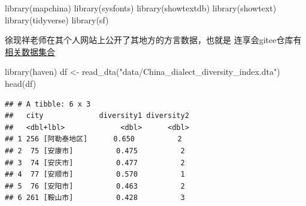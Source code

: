 \documentclass[
  oneside]{book}
\newenvironment{Shaded}{\begin{snugshade}}{\end{snugshade}}
\newcommand{\AttributeTok}[1]{\textcolor[rgb]{0.77,0.63,0.00}{#1}}
\newcommand{\FunctionTok}[1]{\textcolor[rgb]{0.00,0.00,0.00}{#1}}
\newcommand{\NormalTok}[1]{#1}
\newcommand{\OtherTok}[1]{\textcolor[rgb]{0.56,0.35,0.01}{#1}}
\newcommand{\SpecialCharTok}[1]{\textcolor[rgb]{0.00,0.00,0.00}{#1}}
\newcommand{\StringTok}[1]{\textcolor[rgb]{0.31,0.60,0.02}{#1}}
\begin{document}
\begin{Shaded}
\begin{Highlighting}[]
\FunctionTok{library}\NormalTok{(mapchina)}
\FunctionTok{library}\NormalTok{(sysfonts)}
\FunctionTok{library}\NormalTok{(showtextdb)}
\FunctionTok{library}\NormalTok{(showtext)}
\FunctionTok{library}\NormalTok{(tidyverse)}
\FunctionTok{library}\NormalTok{(sf)}
\end{Highlighting}
\end{Shaded}

徐现祥老师在其个人网站上公开了其地方的方言数据，也就是
连享会gitee仓库有\href{https://gitee.com/arlionn/IRE/tree/master/}{相关数据集合}

\begin{Shaded}
\begin{Highlighting}[]
\FunctionTok{library}\NormalTok{(haven)}
\NormalTok{df }\OtherTok{\textless{}{-}} \FunctionTok{read\_dta}\NormalTok{(}\StringTok{"data/China\_dialect\_diversity\_index.dta"}\NormalTok{)}
\FunctionTok{head}\NormalTok{(df)}
\end{Highlighting}
\end{Shaded}

\begin{verbatim}
## # A tibble: 6 x 3
##   city             diversity1 diversity2
##   <dbl+lbl>             <dbl>      <dbl>
## 1 256 [阿勒泰地区]      0.650          2
## 2  75 [安康市]          0.475          2
## 3  74 [安庆市]          0.477          2
## 4  77 [安顺市]          0.570          1
## 5  76 [安阳市]          0.463          2
## 6 261 [鞍山市]          0.428          3
\end{verbatim}

\begin{Shaded}
\end{Shaded}
\end{document}

